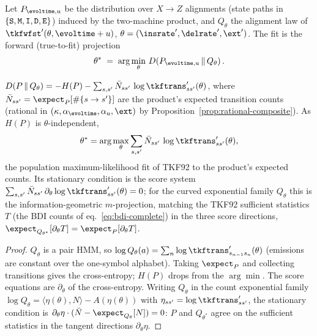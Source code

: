 Let $P_{\evoltime,\evolu}$ be the distribution over $X\!\to\!Z$ alignments
(state paths in $\{\mathtt{S},\mathtt{M},\mathtt{I},\mathtt{D},\mathtt{E}\}$) induced by the two-machine
product, and $Q_\theta$ the alignment law of
$\tkfwfst'(\theta,\evoltime+\evolu)$, $\theta=(\insrate',\delrate',\ext')$.
The fit is the forward (true-to-fit) projection
\begin{equation}
\label{eq:kl-fit}
\theta^* \;=\; \arg\min_\theta\, \dkl{P_{\evoltime,\evolu}}{Q_\theta}.
\end{equation}

\begin{proposition}
\label{prop:kl-mprojection}
$\dkl{P}{Q_\theta} = -H(P) - \sum_{s,s'}\bar N_{ss'}\,
 \log\tkftrans'_{ss'}(\theta)$, where
$\bar N_{ss'}=\expect_P[\#\{s\to s'\}]$ are the product's expected
transition counts (rational in $(\kappa,\alpha_\evoltime,\alpha_\evolu,\ext)$
by Proposition~\ref{prop:rational-composite}).  As $H(P)$ is
$\theta$-independent,
\[
\theta^* = \arg\max_\theta \sum_{s,s'} \bar N_{ss'}\,
 \log\tkftrans'_{ss'}(\theta),
\]
the population maximum-likelihood fit of TKF92 to the product's expected
counts.  Its stationary condition is the score system
$\sum_{s,s'}\bar N_{ss'}\,\partial_\theta\log\tkftrans'_{ss'}(\theta)=0$;
for the curved exponential family $Q_\theta$ this is the
information-geometric $m$-projection, matching the TKF92 sufficient
statistics $T$ (the BDI counts of eq.~\eqref{eq:bdi-complete}) in the three
score directions, $\expect_{Q_{\theta^*}}[\partial_\theta T]
= \expect_P[\partial_\theta T]$.
\end{proposition}

\begin{proof}
$Q_\theta$ is a pair HMM, so
$\log Q_\theta(a)=\sum_n\log\tkftrans'_{s_{n-1}s_n}(\theta)$ (emissions are
constant over the one-symbol alphabet).  Taking $\expect_P$ and collecting
transitions gives the cross-entropy; $H(P)$ drops from the $\arg\min$.  The
score equations are $\partial_\theta$ of the cross-entropy.  Writing
$Q_\theta$ in the count exponential family $\log Q_\theta = \langle
\eta(\theta),N\rangle - A(\eta(\theta))$ with $\eta_{ss'}=\log\tkftrans'_{ss'}$,
the stationary condition is $\partial_\theta\eta\cdot(\bar N -
\expect_{Q_\theta}[N])=0$: $P$ and $Q_{\theta^*}$ agree on the sufficient
statistics in the tangent directions $\partial_\theta\eta$.
\end{proof}

